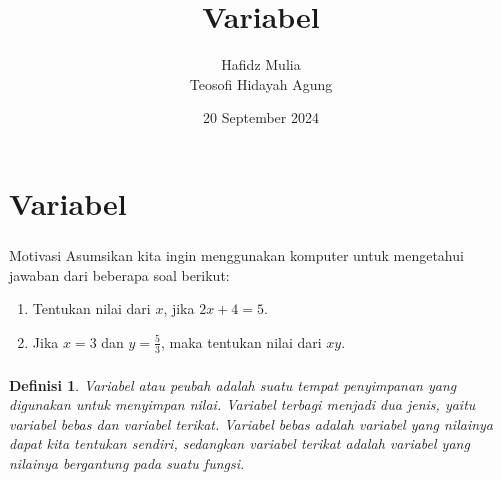 \documentclass[aspectratio=169]{beamer}
\author[Tew \& Haf]{Hafidz Mulia\\Teosofi Hidayah Agung}
\date{20 September 2024}
\title[Alpro 1 - Week 2]{Variabel}
\institute[Matematika ITS]{Departemen Matematika\\ Institut Teknologi Sepuluh Nopember}
\newtheorem*{definisi}{Definisi}
\theoremstyle{definition}
\begin{document}
    {
    \begin{frame}
        \titlepage
    \end{frame}
    }


    \section{Variabel}
    {
    \begin{frame}
        \frametitle{\insertsection}
        \begin{block}{Motivasi}
            Asumsikan kita ingin menggunakan komputer untuk mengetahui jawaban dari beberapa soal berikut:
            \begin{enumerate}[label=\arabic*.]
                \item Tentukan nilai dari $x$, jika $2x+4=5$.
                \item Jika $x=3$ dan $\displaystyle y=\frac{5}{3}$, maka tentukan nilai dari $xy$.
            \end{enumerate}
        \end{block}
    \end{frame}
    }

    \begin{frame}
        \frametitle{\insertsection}
        \begin{definisi}
            Variabel atau peubah adalah suatu tempat penyimpanan yang digunakan untuk menyimpan nilai. Variabel terbagi menjadi dua jenis, yaitu variabel bebas dan variabel terikat. Variabel bebas adalah variabel yang nilainya dapat kita tentukan sendiri, sedangkan variabel terikat adalah variabel yang nilainya bergantung pada suatu fungsi.
        \end{definisi}
    \end{frame}
\end{document}
